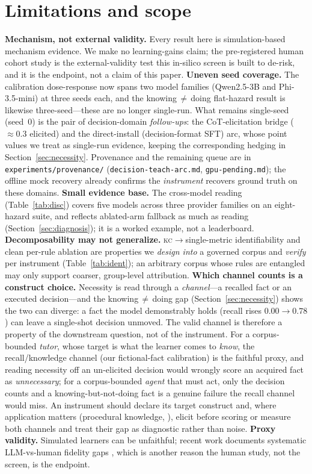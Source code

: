 \documentclass{article}
\newcommand{\kc}{\textsc{kc}}
\begin{document}
\section{Limitations and scope}
\label{sec:limits}
\textbf{Mechanism, not external validity.} Every result here is simulation-based mechanism evidence. We
make no learning-gains claim; the pre-registered human cohort study is the external-validity test this
in-silico screen is built to de-risk, and it is the endpoint, not a claim of this paper.
\textbf{Uneven seed coverage.} The calibration dose-response now spans two model families
(Qwen2.5-3B and Phi-3.5-mini) at three seeds each, and the knowing\,$\neq$\,doing flat-hazard result is
likewise three-seed---these are no longer single-run. What remains single-seed (seed~$0$) is the pair of
decision-domain \emph{follow-ups}: the CoT-elicitation bridge ($\approx\!0.3$ elicited) and the
direct-install (decision-format SFT) arc, whose point values we treat as single-run evidence, keeping the
corresponding hedging in Section~\ref{sec:necessity}. Provenance and the remaining queue are in
\texttt{experiments/provenance/} (\texttt{decision-teach-arc.md}, \texttt{gpu-pending.md}); the offline
mock recovery already confirms the \emph{instrument} recovers ground truth on these domains.
\textbf{Small evidence base.} The cross-model
reading (Table~\ref{tab:disc}) covers five models across three provider families on an eight-hazard
suite, and reflects ablated-arm fallback as much as reading (Section~\ref{sec:diagnosis}); it is a
worked example, not a leaderboard. \textbf{Decomposability may not generalize.}
\kc$\to$single-metric identifiability and clean per-rule ablation are properties we \emph{design into} a
governed corpus and \emph{verify} per instrument (Table~\ref{tab:ident}); an arbitrary corpus whose
rules are entangled may only support coarser, group-level attribution. \textbf{Which channel counts is a construct choice.} Necessity is read through a \emph{channel}---a
recalled fact or an executed decision---and the knowing\,$\neq$\,doing gap (Section~\ref{sec:necessity})
shows the two can diverge: a fact the model demonstrably holds (recall rises $0.00\!\to\!0.78$) can
leave a single-shot decision unmoved. The valid channel is therefore a property of the downstream
question, not of the instrument. For a corpus-bounded \emph{tutor}, whose target is what the learner
comes to \emph{know}, the recall/knowledge channel (our fictional-fact calibration) is the faithful
proxy, and reading necessity off an un-elicited decision would wrongly score an acquired fact as
\emph{unnecessary}; for a corpus-bounded \emph{agent} that must act, only the decision counts and a
knowing-but-not-doing fact is a genuine failure the recall channel would miss. An instrument should
declare its target construct and, where application matters (procedural knowledge, \citealp{koedinger2012kli}),
elicit before scoring or measure both channels and treat their gap as diagnostic rather than noise.
\textbf{Proxy validity.}
Simulated learners can be unfaithful; recent work documents systematic LLM-vs-human fidelity gaps
\citep{validsim2026,studentfidelity2025,studentabilities2025}, which is another reason the human study,
not the screen, is the endpoint.
\end{document}
